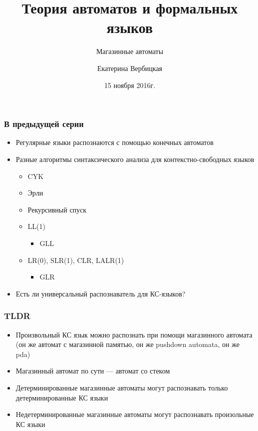 \documentclass{beamer}
\title[]{Теория автоматов и формальных языков}
\subtitle[]{Магазинные автоматы}
\institute[]{
Санкт-Петербургский государственный электротехнический университет <<ЛЭТИ>>\\
}
\author[]{Екатерина Вербицкая}
\date{15 ноября 2016г.}
\begin{document}
{
  \begin{frame}
    \titlepage
  \end{frame}
}

\begin{frame}[fragile]
  \transwipe[direction=90]
  \frametitle{В предыдущей серии}
  \begin{itemize}
    \item Регулярные языки распознаются с помощью конечных автоматов
    \item Разные алгоритмы синтаксического анализа для контекстно-свободных языков
    \begin{itemize}
    	\item CYK
    	\item Эрли
    	\item Рекурсивный спуск
    	\item LL(1)
    	\begin{itemize}
    		\item GLL
    	\end{itemize}
    	\item LR(0), SLR(1), CLR, LALR(1)
    	\begin{itemize}
    		\item GLR
    	\end{itemize}
    \end{itemize}
    \item Есть ли универсальный распознаватель для КС-языков?
  \end{itemize}
\end{frame}

\begin{frame}[fragile]
  \transwipe[direction=90]
  \frametitle{TLDR}
  \begin{itemize}
  	\item Произвольный КС язык можно распознать при помощи магазинного автомата (он же автомат с магазинной памятью, он же pushdown automata, он же pda)
  	\item Магазинный автомат по сути --- автомат со стеком
  	\item Детерминированные магазинные автоматы могут распознавать только детерминированные КС языки
  	\item Недетерминированные магазинные автоматы могут распознавать произольные КС языки
  \end{itemize}
\end{frame}
\end{document}
